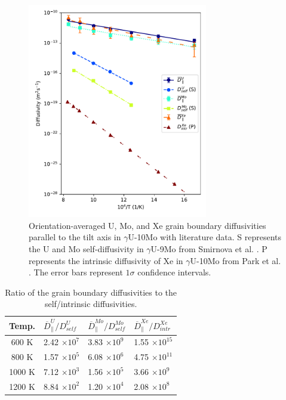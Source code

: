\documentclass{elsarticle}
\begin{document}
\begin{figure}[!ht]
\centering
\includegraphics[width=0.70\textwidth]{newLitComp.pdf}
\caption{Orientation-averaged U, Mo, and Xe grain boundary diffusivities parallel to the tilt axis in $\gamma$U-10Mo with literature data. S represents the U and Mo self-diffusivity in $\gamma$U-9Mo from Smirnova et al. \cite{smirnova2015}. P represents the intrinsic diffusivity of Xe in $\gamma$U-10Mo from Park et al. \cite{park2023}. The error bars represent $1\sigma$ confidence intervals.}
\label{fig:umoxe}
\end{figure}

\begin{table}[!ht]
\centering
\caption{Ratio of the grain boundary diffusivities to the self/intrinsic diffusivities.}
\label{tab:enhance}
\begin{tabular}{clll}
\toprule
Temp.  & $\overline{D}^U_{\parallel}/D^U_{self}$
       & $\overline{D}^{Mo}_{\parallel}/D^{Mo}_{self}$
       & $\overline{D}^{Xe}_{\parallel}/D^{Xe}_{intr}$ \\
\midrule
600 K  & 2.42 $\times 10^7$ & 3.83 $\times 10^9$ & 1.55 $\times 10^{15}$ \\
800 K  & 1.57 $\times 10^5$ & 6.08 $\times 10^6$ & 4.75 $\times 10^{11}$ \\
1000 K & 7.12 $\times 10^3$ & 1.56 $\times 10^5$ & 3.66 $\times 10^9$  \\
1200 K & 8.84 $\times 10^2$ & 1.20 $\times 10^4$ & 2.08 $\times 10^8$  \\
\bottomrule
\end{tabular}
\end{table}
\end{document}
